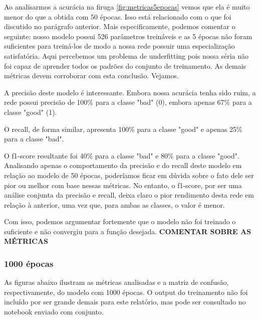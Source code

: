 \documentclass[12pt]{article}
\begin{document}
Ao analisarmos a acurácia na firuga \ref{fig:metricas5epocas} vemos que ela é muito menor do que a obtida com 50 épocas. Isso está relacionado com o que foi discutido no parágrafo anterior. Mais especificamente, podemos comentar o seguinte: nosso modelo possui 526 parâmetros treináveis e as 5 épocas não foram suficientes para treiná-los de modo a nossa rede possuir uma especialização satisfatória. Aqui percebemos um problema de underfitting pois nossa séria não foi capaz de aprender todos os padrões do conjunto de treinamento. As demais métricas devem corroborar com esta conclusão. Vejamos.

A precisão deste modelo é interessante. Embora nossa acurácia tenha sido ruim, a rede possui precisão de 100\% para a classe "bad" (0), embora apenas 67\% para a classe "good" (1).

O recall, de forma similar, apresenta 100\% para a classe "good" e apenas 25\% para a classe "bad".

O f1-score resultante foi 40\% para a classe "bad" e 80\% para a classe "good". Analisando apenas o comportamento da precisão e do recall deste modelo em relação ao modelo de 50 épocas, poderíamos ficar em dúvida sobre o fato dele ser pior ou melhor com base nessas métricas. No entanto, o f1-score, por ser uma análise conjunta da precisão e recall, deixa claro o pior rendimento desta rede em relação à anterior, uma vez que, para ambas as classes, o valor é menor.

Com isso, podemos argumentar fortemente que o modelo não foi treinado o suficiente e não convergiu para a função desejada.
\textbf{COMENTAR SOBRE AS MÉTRICAS}

\subsubsection{1000 épocas}

As figuras abaixo ilustram as métricas analisadas e a matriz de confusão, respectivamente, do modelo com 1000 épocas. O output do treinamento não foi incluído por ser grande demais para este relatório, mas pode ser consultado no notebook enviado com conjunto.
\end{document}
